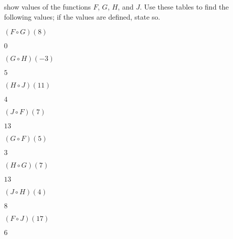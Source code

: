   \begin{exercises}
\begin{problem}\label{fun:prob:compnumerically}
	 show values of the functions
	$F$, $G$, $H$, and $J$. Use these tables to find the following values; if 
	the values are defined, state so.
  \begin{multicols}{4}
  \begin{subproblem}
$(F\circ G)(8)$	  
	\begin{shortsolution}
	$0$	
	\end{shortsolution}
  \end{subproblem}
  \begin{subproblem}
$(G\circ H)(-3)$	  
	\begin{shortsolution}
	$5$	
	\end{shortsolution}
  \end{subproblem}
  \begin{subproblem}
$(H\circ J)(11)$	  
	\begin{shortsolution}
	$4$	
	\end{shortsolution}
  \end{subproblem}
  \begin{subproblem}
$(J\circ F)(7)$	  
	\begin{shortsolution}
	$13$	
	\end{shortsolution}
  \end{subproblem}
  \begin{subproblem}
$(G\circ F)(5)$	  
	\begin{shortsolution}
	$3$	
	\end{shortsolution}
  \end{subproblem}
  \begin{subproblem}
$(H\circ G)(7)$	  
	\begin{shortsolution}
	$13$	
	\end{shortsolution}
  \end{subproblem}
  \begin{subproblem}
$(J\circ H)(4)$	  
	\begin{shortsolution}
	$8$	
	\end{shortsolution}
  \end{subproblem}
  \begin{subproblem}
$(F\circ J)(17)$	  
	\begin{shortsolution}
	$6$	
	\end{shortsolution}
  \end{subproblem}
  \end{multicols}
\end{problem}


\end{exercises}
